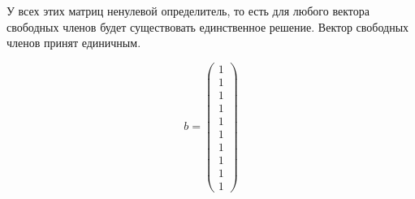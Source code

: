 \documentclass[../../report.tex]{subfiles}
\begin{document}
У всех этих матриц ненулевой определитель, то есть для любого вектора свободных членов будет существовать единственное решение. Вектор свободных членов принят единичным.

\[
b = 
\begin{pmatrix}
    1 \\ 1 \\ 1 \\ 1 \\ 1 \\ 1 \\ 1 \\ 1 \\ 1 \\ 1
\end{pmatrix}
\]
\end{document}
